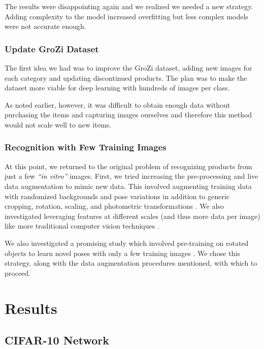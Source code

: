 \documentclass[letterpaper, 11pt]{article}
\begin{document}
The results were disappointing again and we realized we needed a new strategy. Adding complexity to the model increased overfitting but less complex models were not accurate enough.

\subsubsection{Update GroZi Dataset}

The first idea we had was to improve the GroZi dataset, adding new images for each category and updating discontinued products. The plan was to make the dataset more viable for deep learning with hundreds of images per class.

As noted earlier, however, it was difficult to obtain enough data without purchasing the items and capturing images ourselves and therefore this method would not scale well to new items.

\subsubsection{Recognition with Few Training Images}

At this point, we returned to the original problem of recognizing products from just a few \textit{``in vitro''} images. First, we tried increasing the pre-processing and live data augmentation to mimic new data. This involved augmenting training data with randomized backgrounds and pose variations in addition to generic cropping, rotation, scaling, and photometric transformations \cite{DBLP:journals/corr/MasiTLHM16,DBLP:conf/avss/McLaughlinRM15,DBLP:journals/corr/ChatfieldSVZ14}. We also investigated leveraging features at different scales (and thus more data per image) like more traditional computer vision techniques \cite{DBLP:conf/dicta/ZhangWHL09}.

We also investigated a promising study which involved pre-training on rotated objects to learn novel poses with only a few training images \cite{DBLP:journals/corr/HeldTS15}. We chose this strategy, along with the data augmentation procedures mentioned, with which to proceed.

\section{Results}


\subsection{CIFAR-10 Network}
\end{document}
